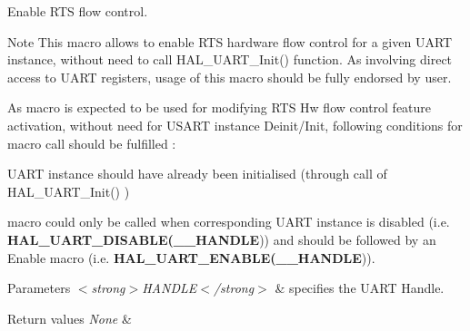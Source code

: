 Enable R\+TS flow control. 

\begin{DoxyNote}{Note}
This macro allows to enable R\+TS hardware flow control for a given U\+A\+RT instance, without need to call H\+A\+L\+\_\+\+U\+A\+R\+T\+\_\+\+Init() function. As involving direct access to U\+A\+RT registers, usage of this macro should be fully endorsed by user. 

As macro is expected to be used for modifying R\+TS Hw flow control feature activation, without need for U\+S\+A\+RT instance Deinit/\+Init, following conditions for macro call should be fulfilled \+:
\begin{DoxyItemize}
\item U\+A\+RT instance should have already been initialised (through call of H\+A\+L\+\_\+\+U\+A\+R\+T\+\_\+\+Init() )
\item macro could only be called when corresponding U\+A\+RT instance is disabled (i.\+e. {\bfseries H\+A\+L\+\_\+\+U\+A\+R\+T\+\_\+\+D\+I\+S\+A\+B\+LE(\+\_\+\+\_\+\+H\+A\+N\+D\+LE})) and should be followed by an Enable macro (i.\+e. {\bfseries H\+A\+L\+\_\+\+U\+A\+R\+T\+\_\+\+E\+N\+A\+B\+LE(\+\_\+\+\_\+\+H\+A\+N\+D\+LE})). 
\end{DoxyItemize}
\end{DoxyNote}

\begin{DoxyParams}{Parameters}
{\em $<$strong$>$\+H\+A\+N\+D\+L\+E$<$/strong$>$} & specifies the U\+A\+RT Handle. \\
\hline
\end{DoxyParams}

\begin{DoxyRetVals}{Return values}
{\em None} & \\
\hline
\end{DoxyRetVals}
\mbox{\label{group___u_a_r_t___exported___macros_ga2dbd7e6592e8c5999f817b69f0fd24bb}} 
